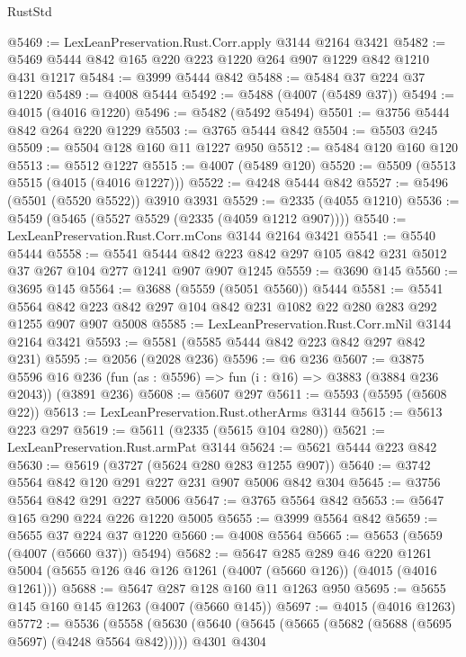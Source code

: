 \begin{lexlean}{RustStd}
\begin{coremodule}
@5469 := LexLeanPreservation.Rust.Corr.apply @3144 @2164 @3421
@5482 := @5469 @5444 @842 @165 @220 @223 @1220 @264 @907 @1229 @842 @1210 @431 @1217
@5484 := @3999 @5444 @842
@5488 := @5484 @37 @224 @37 @1220
@5489 := @4008 @5444
@5492 := @5488 (@4007 (@5489 @37))
@5494 := @4015 (@4016 @1220)
@5496 := @5482 (@5492 @5494)
@5501 := @3756 @5444 @842 @264 @220 @1229
@5503 := @3765 @5444 @842
@5504 := @5503 @245
@5509 := @5504 @128 @160 @11 @1227 @950
@5512 := @5484 @120 @160 @120
@5513 := @5512 @1227
@5515 := @4007 (@5489 @120)
@5520 := @5509 (@5513 @5515 (@4015 (@4016 @1227)))
@5522 := @4248 @5444 @842
@5527 := @5496 (@5501 (@5520 @5522)) @3910 @3931
@5529 := @2335 (@4055 @1210)
@5536 := @5459 (@5465 (@5527 @5529 (@2335 (@4059 @1212 @907))))
@5540 := LexLeanPreservation.Rust.Corr.mCons @3144 @2164 @3421
@5541 := @5540 @5444
@5558 := @5541
    @5444
    @842
    @223
    @842
    @297
    @105
    @842
    @231
    @5012
    @37
    @267
    @104
    @277
    @1241
    @907
    @907
    @1245
@5559 := @3690 @145
@5560 := @3695 @145
@5564 := @3688 (@5559 (@5051 @5560)) @5444
@5581 := @5541
    @5564
    @842
    @223
    @842
    @297
    @104
    @842
    @231
    @1082
    @22
    @280
    @283
    @292
    @1255
    @907
    @907
    @5008
@5585 := LexLeanPreservation.Rust.Corr.mNil @3144 @2164 @3421
@5593 := @5581 (@5585 @5444 @842 @223 @842 @297 @842 @231)
@5595 := @2056 (@2028 @236)
@5596 := @6 @236
@5607 := @3875
    @5596
    @16
    @236
    (fun (as : @5596) => fun (i : @16) => @3883 (@3884 @236 @2043))
    (@3891 @236)
@5608 := @5607 @297
@5611 := @5593 (@5595 (@5608 @22))
@5613 := LexLeanPreservation.Rust.otherArms @3144
@5615 := @5613 @223 @297
@5619 := @5611 (@2335 (@5615 @104 @280))
@5621 := LexLeanPreservation.Rust.armPat @3144
@5624 := @5621 @5444 @223 @842
@5630 := @5619 (@3727 (@5624 @280 @283 @1255 @907))
@5640 := @3742 @5564 @842 @120 @291 @227 @231 @907 @5006 @842 @304
@5645 := @3756 @5564 @842 @291 @227 @5006
@5647 := @3765 @5564 @842
@5653 := @5647 @165 @290 @224 @226 @1220 @5005
@5655 := @3999 @5564 @842
@5659 := @5655 @37 @224 @37 @1220
@5660 := @4008 @5564
@5665 := @5653 (@5659 (@4007 (@5660 @37)) @5494)
@5682 := @5647
    @285
    @289
    @46
    @220
    @1261
    @5004
    (@5655 @126 @46 @126 @1261 (@4007 (@5660 @126)) (@4015 (@4016 @1261)))
@5688 := @5647 @287 @128 @160 @11 @1263 @950
@5695 := @5655 @145 @160 @145 @1263 (@4007 (@5660 @145))
@5697 := @4015 (@4016 @1263)
@5772 := @5536
    (@5558
      (@5630
        (@5640
          (@5645 (@5665 (@5682 (@5688 (@5695 @5697) (@4248 @5564 @842)))))
          @4301
          @4304

\end{coremodule}
\end{lexlean}
